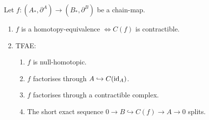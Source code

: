 \documentclass[fontsize=11pt,fleqn,a4paper]{scrartcl}
\begin{document}
\begin{lemma}
Let $f:(A_\ast,\partial^A)\to(B_\ast,\partial^B)$ be a chain-map.
\begin{enumerate}
\item $f$ is a homotopy-equivalence $\iff C(f)$ is contractible.
\item TFAE:
\begin{enumerate}
\item $f$ is null-homotopic.
\item $f$ factorises through $A\hookrightarrow C(\operatorname{id}_A)$.
\item $f$ factorises through a contractible complex.
\item The short exact sequence $0\to B\hookrightarrow C(f)\to A\to 0$ splits.
\end{enumerate}
\end{enumerate}
\end{lemma}
\end{document}
